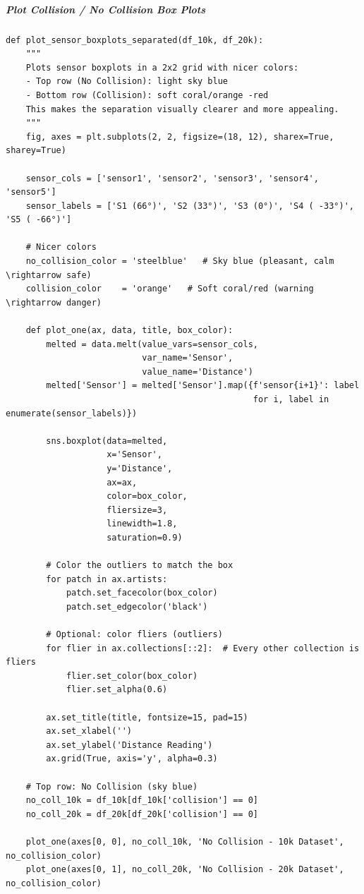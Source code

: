 \subparagraph{Plot Collision / No Collision Box Plots}

\begin{verbatim}
def plot_sensor_boxplots_separated(df_10k, df_20k):
    """
    Plots sensor boxplots in a 2x2 grid with nicer colors:
    - Top row (No Collision): light sky blue
    - Bottom row (Collision): soft coral/orange -red
    This makes the separation visually clearer and more appealing.
    """
    fig, axes = plt.subplots(2, 2, figsize=(18, 12), sharex=True, sharey=True)
    
    sensor_cols = ['sensor1', 'sensor2', 'sensor3', 'sensor4', 'sensor5']
    sensor_labels = ['S1 (66°)', 'S2 (33°)', 'S3 (0°)', 'S4 ( -33°)', 'S5 ( -66°)']
    
    # Nicer colors
    no_collision_color = 'steelblue'   # Sky blue (pleasant, calm \rightarrow safe)
    collision_color    = 'orange'   # Soft coral/red (warning \rightarrow danger)
    
    def plot_one(ax, data, title, box_color):
        melted = data.melt(value_vars=sensor_cols,
                           var_name='Sensor',
                           value_name='Distance')
        melted['Sensor'] = melted['Sensor'].map({f'sensor{i+1}': label 
                                                 for i, label in enumerate(sensor_labels)})
        
        sns.boxplot(data=melted,
                    x='Sensor',
                    y='Distance',
                    ax=ax,
                    color=box_color,
                    fliersize=3,
                    linewidth=1.8,
                    saturation=0.9)
        
        # Color the outliers to match the box
        for patch in ax.artists:
            patch.set_facecolor(box_color)
            patch.set_edgecolor('black')
        
        # Optional: color fliers (outliers)
        for flier in ax.collections[::2]:  # Every other collection is fliers
            flier.set_color(box_color)
            flier.set_alpha(0.6)
        
        ax.set_title(title, fontsize=15, pad=15)
        ax.set_xlabel('')
        ax.set_ylabel('Distance Reading')
        ax.grid(True, axis='y', alpha=0.3)
    
    # Top row: No Collision (sky blue)
    no_coll_10k = df_10k[df_10k['collision'] == 0]
    no_coll_20k = df_20k[df_20k['collision'] == 0]
    
    plot_one(axes[0, 0], no_coll_10k, 'No Collision - 10k Dataset', no_collision_color)
    plot_one(axes[0, 1], no_coll_20k, 'No Collision - 20k Dataset', no_collision_color)
    

\end{verbatim}
